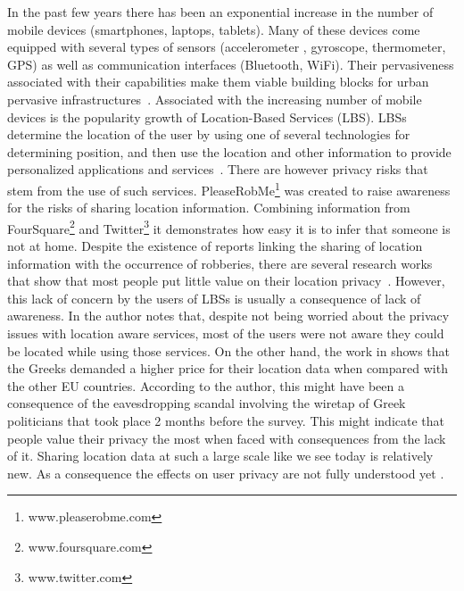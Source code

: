 In the past few years there has been an exponential increase in the
number of mobile devices (smartphones, laptops, tablets). Many of
these devices come equipped with several types of sensors
(accelerometer , gyroscope, thermometer, GPS) as well as communication
interfaces (Bluetooth, WiFi). Their pervasiveness associated with
their capabilities make them viable building blocks for urban
pervasive infrastructures~\cite{kostakos2009understanding}. Associated
with the increasing number of mobile devices is the popularity growth
of Location-Based Services (LBS)\cite{zickuhr2012three}. LBSs
determine the location of the user by using one of several
technologies for determining position, and then use the location and
other information to provide personalized applications and
services~\cite{zibuschka2011location}. There are however privacy risks
that stem from the use of such services.
PleaseRobMe\footnote{www.pleaserobme.com} was created to raise awareness
for the risks of sharing location information. Combining information
from FourSquare\footnote{www.foursquare.com} and
Twitter\footnote{www.twitter.com} it demonstrates how easy it is to
infer that someone is not at home. Despite the existence of reports
linking the sharing of location information with the occurrence of
robberies\cite{Grove:2009:Online,Dybwad:2009:Online}, there are
several research works that show that most people put little value on
their location privacy~\cite{ahern2007over,colbert2001diary,
  Cvrcek:2006:SVL:1179601.1179621,kaasinen2003user}. However, this
lack of concern by the users of LBSs is usually a consequence of lack
of awareness. In \cite{kaasinen2003user} the author notes that,
despite not being worried about the privacy issues with location aware
services, most of the users were not aware they could be located while
using those services. On the other hand, the work in
\cite{Cvrcek:2006:SVL:1179601.1179621} shows that the Greeks demanded
a higher price for their location data when compared with the other EU
countries. According to the author, this might have been a consequence
of the eavesdropping scandal involving the wiretap of Greek
politicians that took place 2 months before the survey. This might
indicate that people value their privacy the most when faced with
consequences from the lack of it. Sharing location data at such a
large scale like we see today is relatively new. As a consequence the
effects on user privacy are not fully understood
yet \cite{Terrovitis:2011:PPD:2031331.2031334}.

